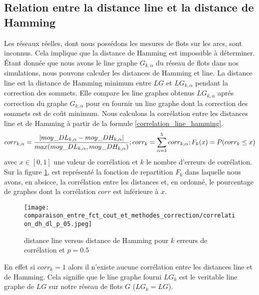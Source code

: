 \documentclass[onecolumn, 12pt]{book}
\begin{document}
\subsection{Relation entre la distance line et la distance de Hamming}
Les r\'eseaux r\'eelles, dont nous poss\'edons les mesures de flots sur les arcs, sont inconnus.
Cela implique que la distance de Hamming est impossible \`a d\'eterminer.
\'Etant donn\'ee que nous avons le line graphe $G_{k,\alpha}$ du r\'eseau de flots dans nos simulations, nous pouvons calculer les distances de Hamming et line. 
\newline
La distance line est la distance de Hamming minimum entre $LG$ et $LG_{k,\alpha}$ pendant la correction des sommets. 
Elle compare les line graphes obtenus $LG_{k,\alpha}$ apr\'es correction du graphe $G_{k,\alpha}$ pour en fournir un line graphe dont la correction des sommets est de co\^ut minimum.
\newline
Nous calculons la corr\'elation entre les distances line et de Hamming \`a partir de la formule \ref{correlation_line_hamming}.
\begin{equation}
	corr_{k,\alpha} =  \frac{ | moy\_DL_{k, \alpha} - moy\_DH_{k, \alpha} | }{ max(moy\_DL_{k, \alpha},  moy\_DH_{k, \alpha}) };
	\\
	corr_{k} = \sum_{\alpha = 1}^{5}corr_{k,\alpha} ;
	\\
	F_k (x) = P(corr_{k} \le x ) 
\label{correlation_line_hamming}
\end{equation}
avec $x \in [0,1]$ une valeur de corr\'elation et $k$ le nombre d'erreurs de corr\'elation. 
\newline
Sur la figure \ref{dh_vs_dl_p_05}, est repr\'esent\'e la fonction de repartition $F_k$ dans laquelle nous avons, en absicce, la corr\'elation entre les distances et, en ordonn\'e, le pourcentage de graphes dont la corr\'elation $corr$ est inf\'erieure \`a $x$. 
\begin{figure}[htb!] 
\centering
\texttt{[image: comparaison\_entre\_fct\_cout\_et\_methodes\_correction/correlation\_dh\_dl\_p\_05.jpeg]}
\caption{ distance line versus distance de Hamming pour $k$ erreurs de corr\'elation et $p = 0.5$ }
\label{dh_vs_dl_p_05} 
\end{figure}
En effet si $corr_k = 1$ alors il n'existe aucune corr\'elation entre les distances line et de Hamming. Cela signifie que le line graphe fourni $LG_{k}$ est  le veritable line graphe de $LG$ sur notre r\'eseau de flots $G$ ($LG_{k} = LG$). 
\end{document}
